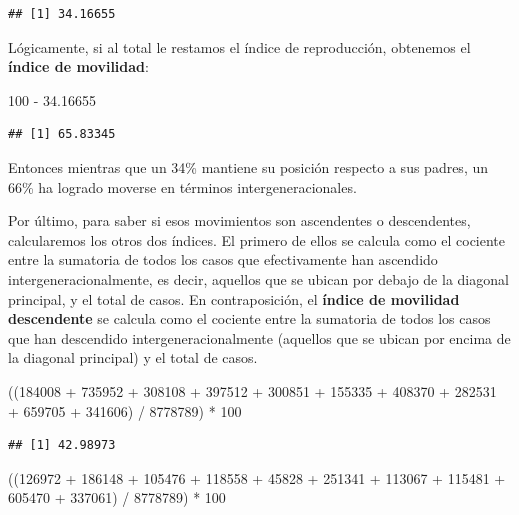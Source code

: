 \documentclass[
]{book}
\newenvironment{Shaded}{\begin{snugshade}}{\end{snugshade}}
\newcommand{\DecValTok}[1]{\textcolor[rgb]{0.00,0.00,0.81}{#1}}
\newcommand{\FloatTok}[1]{\textcolor[rgb]{0.00,0.00,0.81}{#1}}
\newcommand{\NormalTok}[1]{#1}
\newcommand{\SpecialCharTok}[1]{\textcolor[rgb]{0.00,0.00,0.00}{#1}}
\begin{document}
\begin{verbatim}
## [1] 34.16655
\end{verbatim}

Lógicamente, si al total le restamos el índice de reproducción, obtenemos el \textbf{índice de movilidad}:

\begin{Shaded}
\begin{Highlighting}[]
\DecValTok{100} \SpecialCharTok{{-}} \FloatTok{34.16655}
\end{Highlighting}
\end{Shaded}

\begin{verbatim}
## [1] 65.83345
\end{verbatim}

Entonces mientras que un 34\% mantiene su posición respecto a sus padres, un 66\% ha logrado moverse en términos intergeneracionales.

Por último, para saber si esos movimientos son ascendentes o descendentes, calcularemos los otros dos índices. El primero de ellos se calcula como el cociente entre la sumatoria de todos los casos que efectivamente han ascendido intergeneracionalmente, es decir, aquellos que se ubican por debajo de la diagonal principal, y el total de casos. En contraposición, el \textbf{índice de movilidad descendente} se calcula como el cociente entre la sumatoria de todos los casos que han descendido intergeneracionalmente (aquellos que se ubican por encima de la diagonal principal) y el total de casos.

\begin{Shaded}
\begin{Highlighting}[]
\NormalTok{((}\DecValTok{184008} \SpecialCharTok{+} \DecValTok{735952} \SpecialCharTok{+} \DecValTok{308108} \SpecialCharTok{+} \DecValTok{397512} \SpecialCharTok{+} \DecValTok{300851} \SpecialCharTok{+} \DecValTok{155335} \SpecialCharTok{+} \DecValTok{408370} \SpecialCharTok{+} \DecValTok{282531} \SpecialCharTok{+} \DecValTok{659705} \SpecialCharTok{+} \DecValTok{341606}\NormalTok{) }\SpecialCharTok{/} \DecValTok{8778789}\NormalTok{) }\SpecialCharTok{*} \DecValTok{100}
\end{Highlighting}
\end{Shaded}

\begin{verbatim}
## [1] 42.98973
\end{verbatim}

\begin{Shaded}
\begin{Highlighting}[]
\NormalTok{((}\DecValTok{126972} \SpecialCharTok{+} \DecValTok{186148} \SpecialCharTok{+} \DecValTok{105476} \SpecialCharTok{+} \DecValTok{118558} \SpecialCharTok{+} \DecValTok{45828} \SpecialCharTok{+} \DecValTok{251341} \SpecialCharTok{+} \DecValTok{113067} \SpecialCharTok{+} \DecValTok{115481} \SpecialCharTok{+} \DecValTok{605470} \SpecialCharTok{+} \DecValTok{337061}\NormalTok{) }\SpecialCharTok{/} \DecValTok{8778789}\NormalTok{) }\SpecialCharTok{*} \DecValTok{100}
\end{Highlighting}
\end{Shaded}
\end{document}
